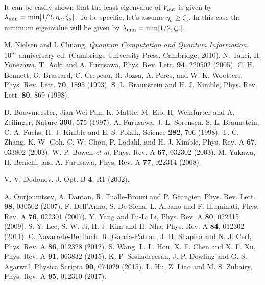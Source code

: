 \documentclass[letter,scriptaddress,twocolumn, prl,showkeys]{revtex4}
\begin{document}
It can be easily shown that the least eigenvalue of $V_{\rm{out}}$ is given by $\lambda_{\rm{min}}=\min[1/2,\eta_{a},\zeta_{a}]$. To be specific, let's assume
$\eta_{a}\geq\zeta_{a}$. In this case the minimum eigenvalue will be given
by $\lambda_{\rm{min}}=\min[1/2,\zeta_{a}]$. 

\begin{thebibliography}{}


 M. Nielsen and I. Chuang, \textit{Quantum Computation and Quantum Information}, $10^{th}$ anniversary ed. (Cambridge University Press, Cambridge, 2010).
 N. Takei, H. Yonezawa, T. Aoki and A. Furusawa, Phys. Rev. Lett. {\bf 94}, 220502 (2005).
 C. H. Bennett, G. Brassard, C. Crepeau, R. Jozsa, A. Peres, and W. K. Wootters, Phys. Rev. Lett. \textbf{70}, 1895 (1993).
 S. L. Braunstein and H. J. Kimble, Phys. Rev. Lett. \textbf{80}, 869 (1998).

 D. Bouwmeester, Jian-Wei Pan, K. Mattle, M. Eib, H. Weinfurter and A. Zeilinger, Nature \textbf{390}, 575 (1997).
 A. Furusawa, J. L. Sorensen, S. L. Braunstein, C. A. Fuchs, H. J. Kimble and E. S. Polzik, Science \textbf{282}, 706 (1998).
 T. C. Zhang, K. W. Goh, C. W. Chou, P. Lodahl, and H. J. Kimble, Phys. Rev. A \textbf{67}, 033802 (2003). 
 W. P. Bowen \emph{et al}, Phys. Rev. A \textbf{67}, 032302 (2003).
 M. Yukawa, H. Benichi, and A. Furusawa, Phys. Rev. A \textbf{77}, 022314 (2008).

 V. V. Dodonov, J. Opt. B \textbf{4}, R1 (2002).

 A. Ourjoumtsev, A. Dantan, R. Tualle-Brouri and P. Grangier, Phys. Rev. Lett. {\bf 98}, 030502 (2007).
 F. Dell'Anno, S. De Siena, L. Albano and F. Illuminati, Phys. Rev. A \textbf{76}, 022301 (2007).
 Y. Yang and Fu-Li Li, Phys. Rev. A \textbf{80}, 022315 (2009).
 S. Y. Lee, S. W. Ji, H. J. Kim and H. Nha, Phys. Rev. A \textbf{84}, 012302 (2011).
 C. Navarrete-Benlloch, R. Garcia-Patron, J. H. Shapiro and N. J. Cerf, Phys. Rev. A {\bf 86}, 012328 (2012).
 S. Wang, L. L. Hou, X. F. Chen and X. F. Xu, Phys. Rev. A {\bf 91}, 063832 (2015).
 K. P. Seshadreesan, J. P. Dowling and G. S. Agarwal, Physica Scripta \textbf{90}, 074029 (2015).
 L. Hu, Z. Liao and M. S. Zubairy, Phys. Rev. A \textbf{95}, 012310 (2017).


\end{thebibliography}
\end{document}
